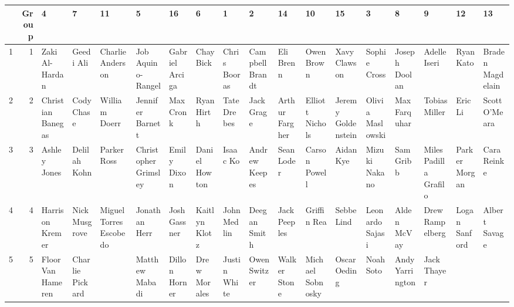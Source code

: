 \documentclass{beamer}
\begin{document}

\begin{table}[ht]
\centering
\begin{tabular}{rrllllllllllllllll}
  \hline
 & Group & 4 & 7 & 11 & 5 & 16 & 6 & 1 & 2 & 14 & 10 & 15 & 3 & 8 & 9 & 12 & 13 \\ 
  \hline
  1 &   1 & Zaki Al-Hardan & Geedi Ali & Charlie Anderson & Job Aquino-Rangel & Gabriel Arciga & Chay Bick & Chris Booras & Campbell Brandt & Eli Brenn & Owen Brown & Xavy Clawson & Sophie Cross & Joseph Doolan & Adelle Iseri & Ryan Kato & Braden Magdelain \\ 
  2 &   2 & Christian Banegas & Cody Chase & William Doerr & Jennifer Barnett & Max Cronk & Ryan Hirth & Tate Drebes & Jack Grage & Arthur Fargher & Elliott Nichols & Jeremy Goldenstein & Olivia Maslowski & Max Farquhar & Tobias Miller & Eric Li & Scott O'Meara \\ 
  3 &   3 & Ashley Jones & Delilah Kohn & Parker Ross & Christopher Grimsley & Emily Dixon & Daniel Howton & Isaac Ko & Andrew Keepes & Sean Loder & Carson Powell & Aidan Kye & Mizuki Nakano & Sam Gribb & Miles Padilla Grafilo & Parker Morgan & Cara Reinke \\ 
  4 &   4 & Harrison Kremer & Nick Musgrove & Miguel Torres Escobedo & Jonathan Herr & Josh Gassner & Kaitlyn Klotz & John Medlin & Deegan Smith & Jack Peeples & Griffin Rea & Sebbe Lind & Leonardo Sajasi & Alden McVay & Drew Rampelberg & Logan Sanford & Albert Savage \\ 
  5 &   5 & Floor Van Hameren & Charlie Pickard &  & Matthew Mabadi & Dillon Horner & Drew Morales & Justin White & Owen Switzer & Walker Stone & Michael Sobnosky & Oscar Oeding & Noah Soto & Andy Yarrington & Jack Thayer &  &  \\ 
   \hline
\end{tabular}
\end{table}
\end{document}
